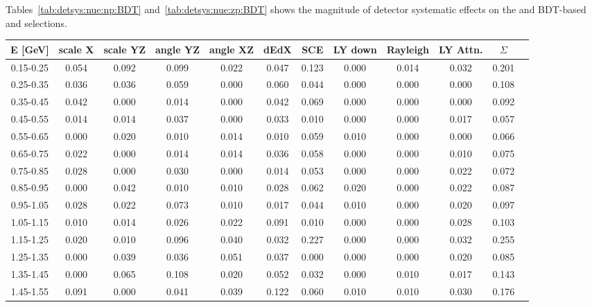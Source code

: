\par Tables~\ref{tab:detsys:nue:np:BDT} and~\ref{tab:detsys:nue:zp:BDT} shows the magnitude of detector systematic effects on the and BDT-based \npsel and \zpsel selections. %


\begin{table}[H]
\centering
\small
\setlength{\tabcolsep}{3pt}
\renewcommand{\arraystretch}{1.25}
 \begin{tabular}{| c | c | c | c | c | c | c | c | c | c | c | c |} 
 \hline
E [GeV] & scale X & scale YZ & angle YZ & angle XZ & dEdX & SCE & LY down & Rayleigh & LY Attn. & $\Sigma$ \\ \hline
0.15-0.25 & 0.054 & 0.092 & 0.099 & 0.022 & 0.047 & 0.123 & 0.000 & 0.014 & 0.032 &  0.201 \\
0.25-0.35 & 0.036 & 0.036 & 0.059 & 0.000 & 0.060 & 0.044 & 0.000 & 0.000 & 0.000 &  0.108 \\
0.35-0.45 & 0.042 & 0.000 & 0.014 & 0.000 & 0.042 & 0.069 & 0.000 & 0.000 & 0.000 &  0.092 \\
0.45-0.55 & 0.014 & 0.014 & 0.037 & 0.000 & 0.033 & 0.010 & 0.000 & 0.000 & 0.017 &  0.057 \\
0.55-0.65 & 0.000 & 0.020 & 0.010 & 0.014 & 0.010 & 0.059 & 0.010 & 0.000 & 0.000 &  0.066 \\
0.65-0.75 & 0.022 & 0.000 & 0.014 & 0.014 & 0.036 & 0.058 & 0.000 & 0.000 & 0.010 &  0.075 \\
0.75-0.85 & 0.028 & 0.000 & 0.030 & 0.000 & 0.014 & 0.053 & 0.000 & 0.000 & 0.022 &  0.072 \\
0.85-0.95 & 0.000 & 0.042 & 0.010 & 0.010 & 0.028 & 0.062 & 0.020 & 0.000 & 0.022 &  0.087 \\
0.95-1.05 & 0.028 & 0.022 & 0.073 & 0.010 & 0.017 & 0.044 & 0.010 & 0.000 & 0.020 &  0.097 \\
1.05-1.15 & 0.010 & 0.014 & 0.026 & 0.022 & 0.091 & 0.010 & 0.000 & 0.000 & 0.028 &  0.103 \\
1.15-1.25 & 0.020 & 0.010 & 0.096 & 0.040 & 0.032 & 0.227 & 0.000 & 0.000 & 0.032 &  0.255 \\
1.25-1.35 & 0.000 & 0.039 & 0.036 & 0.051 & 0.037 & 0.000 & 0.000 & 0.000 & 0.020 &  0.085 \\
1.35-1.45 & 0.000 & 0.065 & 0.108 & 0.020 & 0.052 & 0.032 & 0.000 & 0.010 & 0.017 &  0.143 \\
1.45-1.55 & 0.091 & 0.000 & 0.041 & 0.039 & 0.122 & 0.060 & 0.010 & 0.010 & 0.030 &  0.176 \\

\end{tabular}
\end{table}
